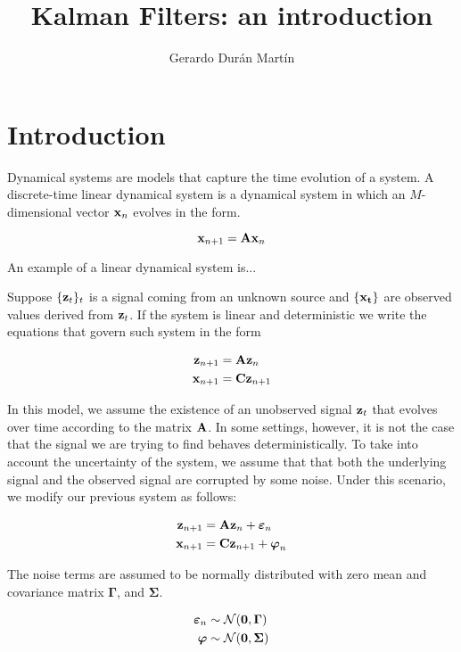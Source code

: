 \documentclass[11pt]{article}
\title{Kalman Filters: an introduction}
\author{Gerardo Durán Martín}
\begin{document}
\maketitle

\section{Introduction}

Dynamical systems are models that capture the time evolution of a system. A discrete-time linear dynamical system is a dynamical system in which an $M$-dimensional vector ${\bf x}_n$ evolves in the form.

\begin{equation}
	{\bf x}_{n+1} = {\bf A x}_n
\end{equation}

An example of a linear dynamical system is...


Suppose $\{{\bf z}_t\}_t$ is a signal coming from an unknown source and $\{{\bf x_t}\}$ are observed values derived from ${\bf z}_t$. If the system is linear and deterministic we write the equations that govern such system in the form

\begin{align*}
	{\bf z}_{n+1} &= {\bf A} {\bf z}_{n}\\
	{\bf x}_{n+1} &= {\bf C} {\bf z}_{n+1}
\end{align*}

In this model, we assume the existence of an unobserved signal ${\bf z}_t$ that evolves over time according to the matrix $\bf A$. In some settings, however, it is not the case that the signal we are trying to find behaves deterministically. To take into account the uncertainty of the system, we assume that that both the underlying signal and the observed signal are corrupted by some noise. Under this scenario, we modify our previous system as follows:
 

\begin{align*}
	{\bf z}_{n+1} &= {\bf A} {\bf z}_{n} + \boldsymbol\varepsilon_n\\
	{\bf x}_{n+1} &= {\bf C} {\bf z}_{n+1} + \boldsymbol\varphi_n
\end{align*}

The noise terms are assumed to be normally distributed with zero mean and covariance matrix $\boldsymbol{\Gamma}$, and $\boldsymbol{\Sigma}$.



\begin{align}
	\boldsymbol\varepsilon_n &\sim \mathcal{N}({\bf 0}, \boldsymbol\Gamma)\\
	\boldsymbol\varphi & \sim \mathcal{N}({\bf 0}, \boldsymbol\Sigma)
\end{align}
\end{document}
